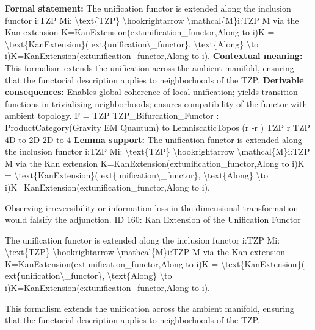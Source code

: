 \begingroup\footnotesize\setlength{\emergencystretch}{3em}\sloppy
\textbf{Formal statement:} The unification functor is extended along the inclusion functor i:TZP Mi: \textbackslash{}text\{TZP\} \textbackslash{}hookrightarrow \textbackslash{}mathcal\{M\}i:TZP M via the Kan extension K=KanExtension(extunification\_functor,Along to i)K = \textbackslash{}text\{KanExtension\}( ext\{unification\textbackslash{}\_functor\}, \textbackslash{}text\{Along\} \textbackslash{}to i)K=KanExtension(extunification\_functor,Along to i).
\textbf{Contextual meaning:} This formalism extends the unification across the ambient manifold, ensuring that the functorial description applies to neighborhoods of the TZP.  
\textbf{Derivable consequences:} Enables global coherence of local unification; yields transition functions in trivializing neighborhoods; ensures compatibility of the functor with ambient topology. F = TZP TZP\_Bifurcation\_Functor : ProductCategory(Gravity   EM   Quantum) to LemniscaticTopos  (r -r ) TZP r TZP 4D to 2D 2D to 4
\textbf{Lemma support:} The unification functor is extended along the inclusion functor i:TZP Mi: \textbackslash{}text\{TZP\} \textbackslash{}hookrightarrow \textbackslash{}mathcal\{M\}i:TZP M via the Kan extension K=KanExtension(extunification\_functor,Along to i)K = \textbackslash{}text\{KanExtension\}( ext\{unification\textbackslash{}\_functor\}, \textbackslash{}text\{Along\} \textbackslash{}to i)K=KanExtension(extunification\_functor,Along to i).\par
\endgroup

Observing irreversibility or information loss in the dimensional transformation would falsify the adjunction. ID 160: Kan Extension of the Unification Functor  

The unification functor is extended along the inclusion functor i:TZP Mi: \textbackslash{}text\{TZP\} \textbackslash{}hookrightarrow \textbackslash{}mathcal\{M\}i:TZP M via the Kan extension K=KanExtension(extunification\_functor,Along to i)K = \textbackslash{}text\{KanExtension\}( ext\{unification\textbackslash{}\_functor\}, \textbackslash{}text\{Along\} \textbackslash{}to i)K=KanExtension(extunification\_functor,Along to i).

This formalism extends the unification across the ambient manifold, ensuring that the functorial description applies to neighborhoods of the TZP.  
\endgroup

